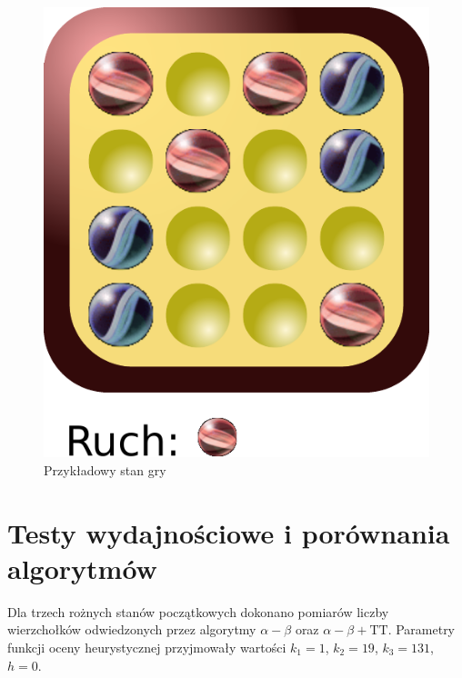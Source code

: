 \documentclass{scrartcl}
\begin{document}
\begin{figure}[h]
  \centering
  \includegraphics[scale=0.6]{data/position1.pdf}
  \caption{Przykładowy stan gry}
  \label{fig:position1a}
\end{figure}

\section{Testy wydajnościowe i porównania algorytmów}

Dla trzech rożnych stanów początkowych dokonano pomiarów liczby
wierzchołków odwiedzonych przez algorytmy $\alpha - \beta$ oraz
$\alpha - \beta + \text{TT}$. Parametry funkcji oceny heurystycznej
przyjmowały wartości $k_1 = 1$, $k_2 = 19$, $k_3 = 131$, $h = 0$.
\end{document}
